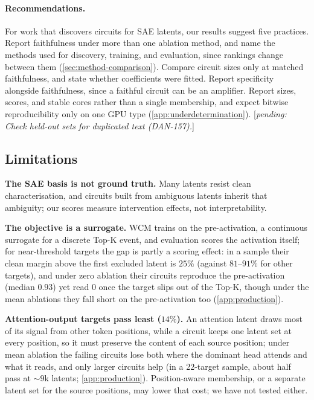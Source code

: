 \documentclass[10pt]{article}
\newcommand{\pending}[1]{\textcolor{red!70!black}{[\textit{pending: #1}]}}
\begin{document}
\paragraph{Recommendations.}
For work that discovers circuits for SAE latents, our results suggest five practices.
Report faithfulness under more than one ablation method, and name the methods used for discovery, training, and evaluation, since rankings change between them (\cref{sec:method-comparison}).
Compare circuit sizes only at matched faithfulness, and state whether coefficients were fitted.
Report specificity alongside faithfulness, since a faithful circuit can be an amplifier.
Report sizes, scores, and stable cores rather than a single membership, and expect bitwise reproducibility only on one GPU type (\cref{app:underdetermination}).
\pending{Check held-out sets for duplicated text (DAN-157).}

\subsection{Limitations}
\label{sec:limitations}

\textbf{The SAE basis is not ground truth.}
Many latents resist clean characterisation, and circuits built from ambiguous latents inherit that ambiguity; our scores measure intervention effects, not interpretability.

\textbf{The objective is a surrogate.}
WCM trains on the pre-activation, a continuous surrogate for a discrete Top-K event, and evaluation scores the activation itself; for near-threshold targets the gap is partly a scoring effect: in a sample their clean margin above the first excluded latent is $25\%$ (against $81$--$91\%$ for other targets), and under zero ablation their circuits reproduce the pre-activation (median $0.93$) yet read $0$ once the target slips out of the Top-K, though under the mean ablations they fall short on the pre-activation too (\cref{app:production}).

\textbf{Attention-output targets pass least ($14\%$).}
An attention latent draws most of its signal from other token positions, while a circuit keeps one latent set at every position, so it must preserve the content of each source position; under mean ablation the failing circuits lose both where the dominant head attends and what it reads, and only larger circuits help (in a 22-target sample, about half pass at ${\sim}9$k latents; \cref{app:production}).
Position-aware membership, or a separate latent set for the source positions, may lower that cost; we have not tested either.
\end{document}

